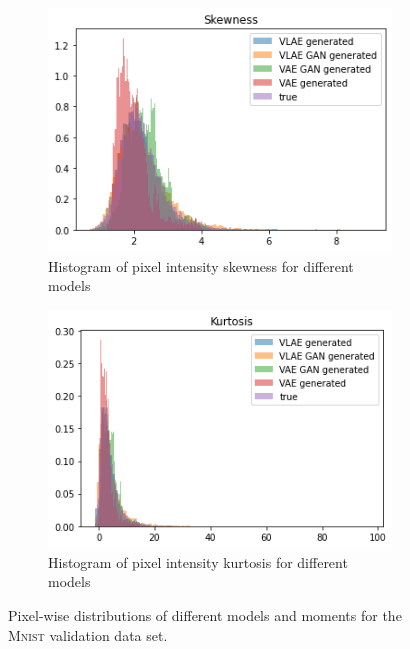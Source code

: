\begin{figure}
    \begin{subfigure}{0.4\textwidth}
        \centering
        \includegraphics[width=\textwidth]{images/generated_vs_true/mnist/mnist_vs_models_skew.png}
        \caption{Histogram of pixel intensity skewness for different models}
        \label{subfig:skew_generated_vs_true}
    \end{subfigure}
    \hfill
    \begin{subfigure}{0.4\textwidth}
        \centering
        \includegraphics[width=\textwidth]{images/generated_vs_true/mnist/mnist_vs_models_kurt.png}
        \caption{Histogram of pixel intensity kurtosis for different models}
        \label{subfig:kurt_generated_vs_true}
    \end{subfigure}
    \caption[Models on \textsc{Mnist}: Pixel-wise distributions]{Pixel-wise distributions of different models and moments for the \textsc{Mnist} validation data set.}
    \label{fig:mean_generated_vs_true}
\end{figure}

